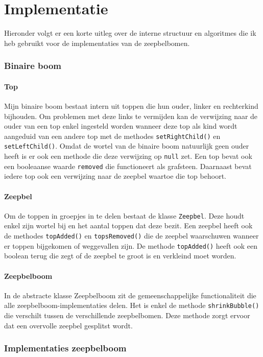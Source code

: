 \documentclass[12pt]{article}
\begin{document}
    \part*{Implementatie}
    Hieronder volgt er een korte uitleg over de interne structuur en algoritmes die
    ik heb gebruikt voor de implementaties van de zeepbelbomen.
    \section{Binaire boom}
    \subsection{Top}
    Mijn binaire boom bestaat intern uit toppen die hun ouder,  linker en
    rechterkind bijhouden. Om problemen met deze links te vermijden kan de verwijzing
    naar de ouder van een top enkel ingesteld worden wanneer deze top als kind wordt
    aangeduid van een andere top met de methodes {\tt setRightChild()} en {\tt setLeftChild()}. Omdat de wortel van de binaire boom natuurlijk geen
    ouder heeft is er ook een methode die deze verwijzing op {\tt null} zet.
    Een top bevat ook een booleaanse waarde {\tt removed} die functioneert als
    grafsteen. Daarnaast bevat iedere top ook een verwijzing naar de zeepbel waartoe die 
    top behoort.
    \subsection{Zeepbel}
    Om de toppen in groepjes in te delen bestaat de klasse {\tt Zeepbel}. Deze houdt
    enkel zijn wortel bij en het aantal toppen dat deze bezit. Een zeepbel heeft ook de
    methodes {\tt topAdded()} en {\tt topsRemoved()} die de zeepbel waarschuwen wanneer
    er toppen bijgekomen of weggevallen zijn. De methode {\tt topAdded()} heeft ook
    een boolean terug die zegt of de zeepbel te groot is en verkleind moet worden.
    \subsection{Zeepbelboom}
    In de abstracte klasse Zeepbelboom zit de gemeenschappelijke functionaliteit die
    alle zeepbelboom-implementaties delen. Het is enkel de methode {\tt shrinkBubble()}
    die verschilt tussen de verschillende zeepbelbomen. Deze methode zorgt ervoor dat een 
    overvolle zeepbel gesplitst wordt.

    \section{Implementaties zeepbelboom}
\end{document}

